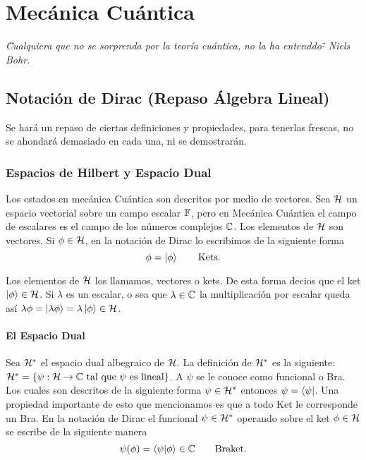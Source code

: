 \part{Mecánica Cuántica}

\vspace*{\fill}

\begin{center}
	\textit{\" Cualquiera que no se sorprenda por la teoría cuántica, no la ha entenddo\" - Niels Bohr.}
\end{center}

\vspace*{\fill}


\chapter{Notación de Dirac (Repaso Álgebra Lineal)}

Se hará un repaso de ciertas definiciones y propiedades, para tenerlas frescas, no se ahondará demasiado en cada una, ni se demostrarán. \\


\section{Espacios de Hilbert y Espacio Dual}
Los estados en mecánica Cuántica son descritos por medio de vectores. Sea $\mathcal{H}$ un espacio vectorial sobre un campo escalar $\mathbb{F}$, pero en Mecánica Cuántica el campo de escalares es el campo de los números complejos $\mathbb{C}$. Los elementos de $\mathcal{H}$ son vectores. Si $\phi \in \mathcal{H}$, en la notación de Dirac lo escribimos de la siguiente forma
	$$ \phi = \ket{\phi} \qquad \text{Kets}. $$
	
Los elementos de $\mathcal{H}$ los llamamos, vectores o kets. De esta forma decios que el ket $\ket{\phi} \in \mathcal{H}$. Si $\lambda$ es un escalar, o sea que $\lambda \in \mathbb{C}$ la multiplicación por escalar queda así $\lambda \phi = \ket{\lambda \phi} = \lambda \ket{\phi} \in \mathcal{H}$.

\subsection{El Espacio Dual}
Sea $\mathcal{H} ^*$ el espacio dual albegraico de $\mathcal{H}$. La definición de $\mathcal{H} ^*$ es la siguiente: $\mathcal{H} ^* = \{ \psi : \mathcal{H} \to \mathbb{C} \text{ tal que } \psi \text{ es lineal} \}$. A $\psi$ se le conoce como funcional o Bra. Los cuales son descritos de la siguiente forma $\psi \in \mathcal{H} ^*$ entonces $\psi = \bra{\psi}$. Una propiedad importante de esto que mencionamos es que a todo Ket le corresponde un Bra. En la notación de Dirac el funcional $\psi \in \mathcal{H} ^*$ operando sobre el ket $\phi \in \mathcal{H}$ se escribe de la siguiente manera
	$$ \psi (\phi) = \braket{\psi}{\phi} \in \mathbb{C} \qquad \text{Braket}. $$

